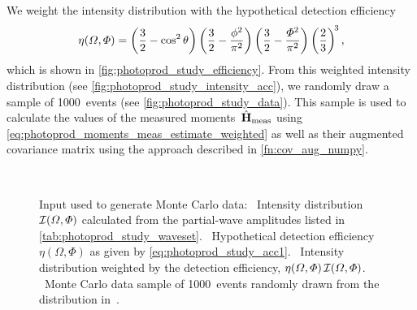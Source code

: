 We weight the intensity distribution with the hypothetical detection
efficiency
\begin{equation}
  \label{eq:photoprod_study_acc1}
  \eta(\Omega, \Phi)
  = \rBrk[3]{\frac{3}{2} - \cos^2 \theta} \rBrk[3]{\frac{3}{2} - \frac{\phi^2}{\pi^2}} \rBrk[3]{\frac{3}{2} - \frac{\Phi^2}{\pi^2}} \rBrk[3]{\frac{2}{3}}^{\!3},
\end{equation}
which is shown in \cref{fig:photoprod_study_efficiency}.  From this
weighted intensity distribution (see
\cref{fig:photoprod_study_intensity_acc}), we randomly draw a sample
of \num{1000}~events (see \cref{fig:photoprod_study_data}).  This
sample is used to calculate the values of the measured
moments~$\hat{\bm{\mathrm{H}}}_\text{meas}$ using
\cref{eq:photoprod_moments_meas_estimate_weighted} as well as their augmented
covariance matrix using the approach described in
\cref{fn:cov_aug_numpy}.

\begin{figure}[tbp]
  \centering%
  \\%
  \caption{Input used to generate Monte Carlo data:
  ~Intensity distribution
  $\mathcal{I}(\Omega, \Phi)$ calculated from the partial-wave
  amplitudes listed in \cref{tab:photoprod_study_waveset}.
  ~Hypothetical
  detection efficiency $\eta(\Omega, \Phi)$ as given by
  \cref{eq:photoprod_study_acc1}.
  ~Intensity
  distribution weighted by the detection efficiency, \ie $\eta(\Omega,
  \Phi)\, \mathcal{I}(\Omega, \Phi)$.
  ~Monte Carlo data sample of
  \num{1000}~events randomly drawn from the distribution
  in~.}%
  \label{fig:photoprod_study_input}%
\end{figure}

